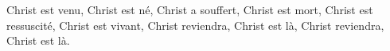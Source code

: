 Christ est venu, Christ est né, Christ a souffert, Christ est mort, 
Christ est ressuscité, Christ est vivant,
Christ reviendra, Christ est là,
Christ reviendra, Christ est là.
